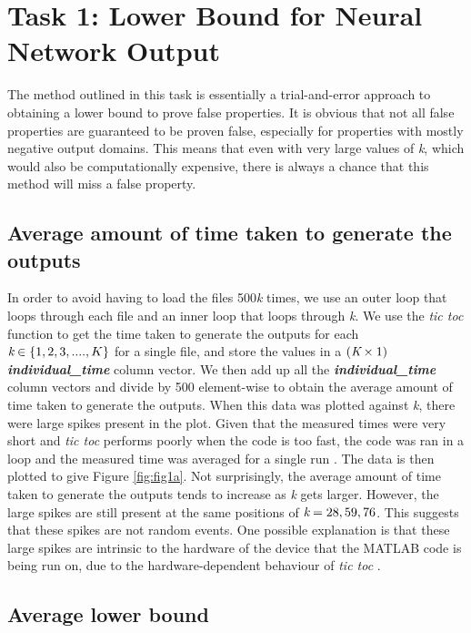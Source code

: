 \documentclass[11pt]{article}
\begin{document}
\section{Task 1: Lower Bound for Neural Network Output}
\label{sec:Task 1}
The method outlined in this task is essentially a trial-and-error approach to obtaining a lower bound to prove false properties. It is obvious that not all false properties are guaranteed to be proven false, especially for properties with mostly negative output domains. This means that even with very large values of \emph{k}, which would also be computationally expensive, there is always a chance that this method will miss a false property.
\subsection{Average amount of time taken to generate the outputs}
\label{sec:131}
 In order to avoid having to load the files 500\emph{k} times, we use an outer loop that loops through each file and an inner loop that loops through \emph{k}. We use the \emph{tic toc} function to get the time taken to generate the outputs for each $\emph{k}\in{\{1,2,3,....,K\}}$ for a single file, and store the values in a $(\emph{K}\times1)$ \emph{\textbf{individual\_time}} column vector. We then add up all the \emph{\textbf{individual\_time}} column vectors and divide by 500 element-wise to obtain the average amount of time taken to generate the outputs. When this data was plotted against \emph{k}, there were large spikes present in the plot. Given that the measured times were very short and \emph{tic toc} performs poorly when the code is too fast, the code was ran in a loop and the measured time was averaged for a single run \cite{tictoc}. The data is then plotted to give Figure \ref{fig:fig1a}. Not surprisingly, the average amount of time taken to generate the outputs tends to increase as \emph{k} gets larger. However, the large spikes are still present at the same positions of $\emph{k}=28,59,76$. This suggests that these spikes are not random events. One possible explanation is that these large spikes are intrinsic to the hardware of the device that the MATLAB code is being run on, due to the hardware-dependent behaviour of \emph{tic toc} \cite{hardware}.
 
\subsection{Average lower bound}
\label{sec:1.2}
\end{document}
